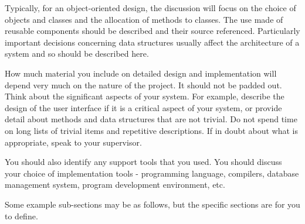Typically, for an object-oriented design, the discussion will focus on the choice of objects and classes and the allocation of methods to classes. The use made of reusable components should be described and their source referenced. Particularly important decisions concerning data structures usually affect the architecture of a system and so should be described here.

How much material you include on detailed design and implementation will depend very much on the nature of the project. It should not be padded out. Think about the significant aspects of your system. For example, describe the design of the user interface if it is a critical aspect of your system, or provide detail about methods and data structures that are not trivial. Do not spend time on long lists of trivial items and repetitive descriptions. If in doubt about what is appropriate, speak to your supervisor.
 
You should also identify any support tools that you used. You should discuss your choice of implementation tools - programming language, compilers, database management system, program development environment, etc.

Some example sub-sections may be as follows, but the specific sections are for you to define. 
